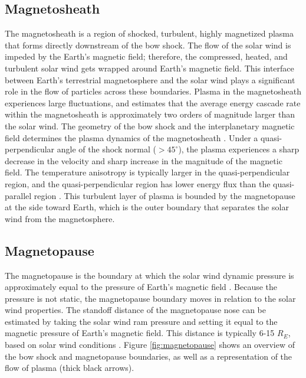 \subsection{Magnetosheath}
The magnetosheath is a region of shocked, turbulent, highly magnetized plasma that forms directly downstream of the bow shock. The flow of the solar wind is impeded by the Earth's magnetic field; therefore, the compressed, heated, and turbulent solar wind gets wrapped around Earth's magnetic field. This interface between Earth's terrestrial magnetosphere and the solar wind plays a significant role in the flow of particles across these boundaries. Plasma in the magnetosheath experiences large fluctuations, and \cite{Hadid:2018} estimates that the average energy cascade rate within the magnetosheath is approximately two orders of magnitude larger than the solar wind. The geometry of the bow shock and the interplanetary magnetic field determines the plasma dynamics of the magnetosheath \citep{Yordanova:2020}. Under a quasi-perpendicular angle of the shock normal ($>45^\circ$), the plasma experiences a sharp decrease in the velocity and sharp increase in the magnitude of the magnetic field. The temperature anisotropy is typically larger in the quasi-perpendicular region, and the quasi-perpendicular region has lower energy flux than the quasi-parallel region \citep{Gurchumelia:2022}. This turbulent layer of plasma is bounded by the magnetopause at the side toward Earth, which is the outer boundary that separates the solar wind from the magnetosphere. 

\subsection{Magnetopause}
The magnetopause is the boundary at which the solar wind dynamic pressure is approximately equal to the pressure of Earth's magnetic field \citep{Shue:1997}. Because the pressure is not static, the magnetopause boundary moves in relation to the solar wind properties. The standoff distance of the magnetopause nose can be estimated by taking the solar wind ram pressure and setting it equal to the magnetic pressure of Earth's magnetic field. This distance is typically 6-15 $R_E$, based on solar wind conditions \citep{Collado-Vega:2023}. Figure \ref{fig:magnetopause} shows an overview of the bow shock and magnetopause boundaries, as well as a representation of the flow of plasma (thick black arrows). 

